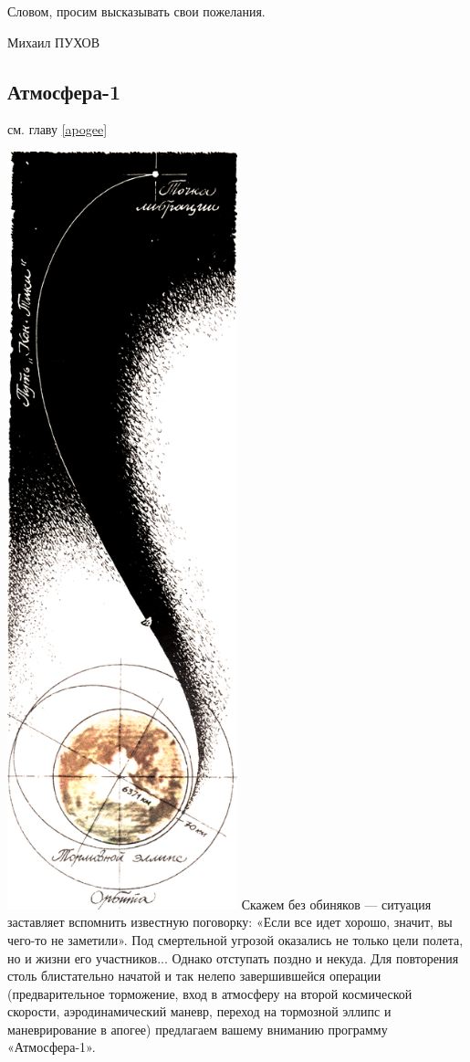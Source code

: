 \documentclass[11pt,a4paper,oneside]{article}
\begin{document}
Словом, просим высказывать свои пожелания.

Михаил ПУХОВ

\subsection{Атмосфера-1}
см. главу \ref{apogee}

\includegraphics[width=0.5\textwidth]{apogee2}
Скажем без обиняков — ситуация заставляет вспомнить известную поговорку: «Если все идет хорошо, значит, вы чего-то не заметили». Под смертельной угрозой оказались не только цели полета, но и жизни его участников... Однако отступать поздно и некуда. Для повторения столь блистательно начатой и так нелепо завершившейся операции (предварительное торможение, вход в атмосферу на второй космической скорости, аэродинамический маневр, переход на тормозной эллипс и маневрирование в апогее) предлагаем вашему вниманию программу «Атмосфера-1».
\end{document}
